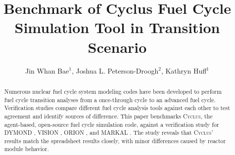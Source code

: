 \documentclass{elsarticle}
\newcommand{\Cyclus}{\textsc{Cyclus}\xspace}%
\begin{document}
\begin{frontmatter}

\title{Benchmark of Cyclus Fuel Cycle Simulation Tool in Transition Scenario}
\author{Jin Whan Bae$^{1}$, Joshua L. Peterson-Droogh$^{2}$, Kathryn Huff$^{1}$}
\address{$^{1}$Dept. of Nuclear, Plasma, and Radiological Engineering, University of Illinois at Urbana-Champaign, Urbana, IL \\ $^{2}$Oak Ridge National Laboratory, Oak Ridge, TN }

\begin{abstract}
Numerous nuclear fuel cycle system modeling codes
have been developed to perform fuel cycle transition
analyses from a once-through cycle to an advanced
fuel cycle. Verification studies compare different
fuel cycle analysis tools against each other to
test agreement and identify sources of difference.
This paper benchmarks \Cyclus, the agent-based,
open-source fuel cycle simulation code, against
a verification study \cite{feng_standardized_2016} for
DYMOND \cite{yacout_modeling_2005},
VISION \cite{jacobson_verifiable_2010},
ORION \cite{gregg_analysis_2012}, and
MARKAL \cite{shay_epa_2006}. The study reveals
that \Cyclus' results match the spreadsheet results
closely, with minor differences caused by
reactor module behavior.
\end{abstract}

\end{frontmatter}

	









\end{document}
